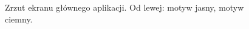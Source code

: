 \documentclass{SGGW-thesis}
\begin{document}
\begin{figure}
  \caption[Ekran główny]{
    \label{screen.glowny}
    Zrzut ekranu głównego aplikacji. Od lewej: motyw jasny, motyw ciemny. \vspace{2ex}
  }
\end{figure}


\begin{thebibliography}{9}
\end{thebibliography}

\beforelastpage
\end{document}
